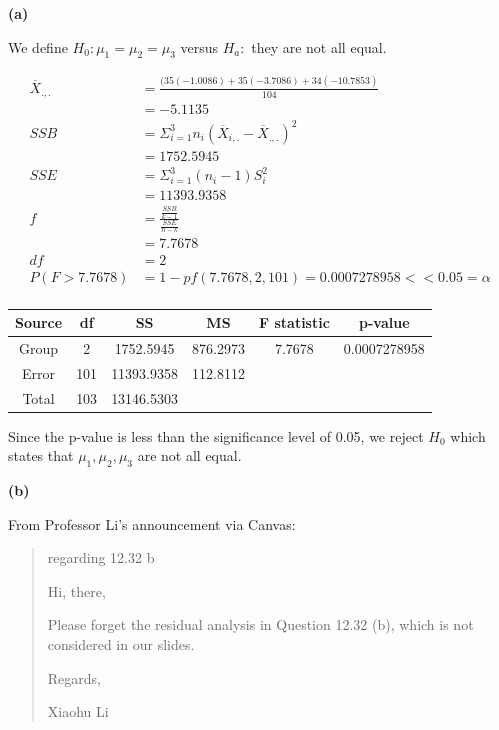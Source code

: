 \documentclass[11pt]{article}
\renewcommand\part[1]{\vspace{.10in}\textbf{(#1)}\par}
\begin{document}
	\part{a}
		We define $H_{0}: \mu_{1} = \mu_{2} = \mu_{3}$ versus $H_{a}:$ they are not all equal.\par
		\begin{align*}
			\overline{X}_{.,.} &= \frac{(35(-1.0086) + 35(-3.7086) + 34(-10.7853)}{104}\\
			&= -5.1135\\
			SSB &= \Sigma^{3}_{i=1} n_{i}(\overline{X}_{i,.}-\overline{X}_{.,.})^{2}\\
			&= 1752.5945\\
			SSE &= \Sigma^{3}_{i=1}(n_{i}-1)S^{2}_{i}\\
			&= 11393.9358\\
			f &= \frac{\frac{SSB}{k-1}}{\frac{SSE}{n-k}}\\
			&= 7.7678\\
			df &= 2\\
			P(F>7.7678) &= 1-pf(7.7678, 2, 101) = 0.0007278958 << 0.05 = \alpha\\
		\end{align*}\par
		\begin{tabular}{|c|c|c|c|c|c|}
			\hline
			Source & df & SS & MS & F statistic & p-value\\
			\hline
			Group & 2 & 1752.5945 & 876.2973 & 7.7678 & 0.0007278958\\
			\hline
			Error & 101 & 11393.9358 & 112.8112 & &\\
			\hline
			Total & 103 & 13146.5303 &&&\\
			\hline
		\end{tabular}\par
		Since the p-value is less than the significance level of 0.05, we reject $H_{0}$ which states that $\mu_{1}, \mu_{2}, \mu_{3}$ are not all equal.\par
		
	
	\part{b}
		From Professor Li's announcement via Canvas:\par
		\begin{quotation}
		regarding 12.32 b
		
		Hi, there,

		Please forget the residual analysis in Question 12.32 (b), which is not considered in our slides.

		Regards,
		
		Xiaohu Li
		\end{quotation}\par
	
\end{document}
